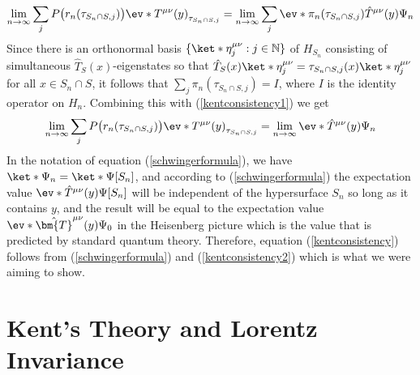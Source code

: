 \documentclass[12pt]{report}
\begin{document}
\begin{equation}\label{kentconsistency1}
\lim_{n\rightarrow\infty}\sum_jP\big(r_n(\tau_{S_n\cap S, j})\big)\ev*{T^{\mu\nu}(y)}_{\tau_{S_n\cap S, j}}=\lim_{n\rightarrow\infty}\sum_{j}{\ev*{\pi_{n}(\tau_{S_n\cap S, j})\hat{T}^{\mu\nu}(y)}{\Psi_n}}
\end{equation}
Since there is an orthonormal basis $\{\ket*{\eta_j^{\mu\nu}}:j\in\mathbb{N}\}$ of $H_{S_n}$ consisting of simultaneous $\hat{T}_S(x)$-eigenstates so that $\hat{T}_S(x)\ket*{\eta_j^{\mu\nu}}=\tau_{S_n\cap S, j}(x)\ket*{\eta_j^{\mu\nu}}$ for all $x\in S_n\cap S$, it follows that $\sum_j \pi_{n}(\tau_{S_n\cap S, j})=I$, where $I$ is the identity operator on $H_n$. Combining this with (\ref{kentconsistency1}) we get
\begin{equation}\label{kentconsistency2}
	\lim_{n\rightarrow\infty}\sum_jP\big(r_n(\tau_{S_n\cap S, j})\big)\ev*{T^{\mu\nu}(y)}_{\tau_{S_n\cap S, j}}=\lim_{n\rightarrow\infty}\ev*{\hat{T}^{\mu\nu}(y)}{\Psi_n}
	\end{equation}
In the notation of equation (\ref{schwingerformula}), we have $\ket*{\Psi_n}=\ket*{\Psi[S_n]}$, %
%
and according to (\ref{schwingerformula}) the expectation value $\ev*{\hat{T}^{\mu\nu}(y)}{\Psi[S_n]}$ will be independent of the hypersurface $S_n$ so long as it contains $y$, and the result will be equal to the expectation value $\ev*{\hat{\bm{T}}^{\mu\nu}(y)}{\Psi_0}$ in the Heisenberg picture which is the value that is predicted by standard quantum theory. Therefore, equation (\ref{kentconsistency}) follows from (\ref{schwingerformula}) and (\ref{kentconsistency2}) which is what we were aiming to show.




\section{Kent's Theory and Lorentz Invariance\label{LorentzInvariance}}
\end{document}
